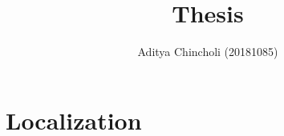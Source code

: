\documentclass{article}
\title{Thesis}
\author{Aditya Chincholi (20181085)}
\begin{document}
\maketitle




\section{Localization}
\end{document}
